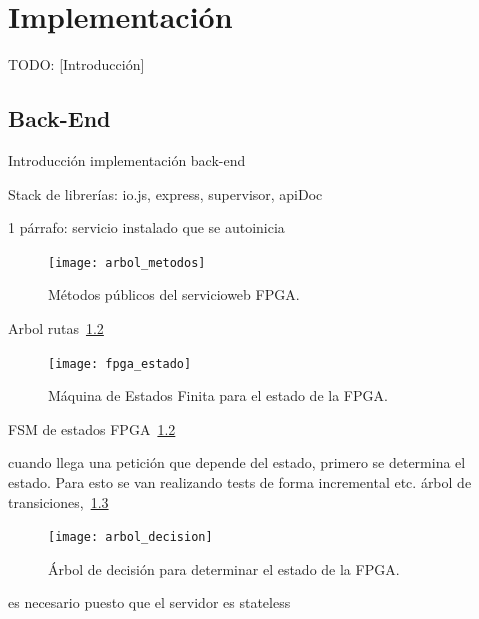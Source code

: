 \chapter{Implementación\label{cap:implementacion}}

TODO: [Introducción]


\section{Back-End\label{sec:imp:back_end}}

Introducción implementación back-end

Stack de librerías: io.js, express, supervisor, apiDoc

1 párrafo: servicio instalado que se autoinicia

\begin{figure}[!htp]
  \centering
  \texttt{[image: arbol\_metodos]}
  \caption{Métodos públicos del \gls{servicioweb} \gls{FPGA}.}
  \label{fig:arbol_metodos}
\end{figure}

Arbol rutas~\ref{fig:fpga_estado}

\begin{figure}[!htp]
  \centering
  \texttt{[image: fpga\_estado]}
  \caption{Máquina de Estados Finita para el estado de la \gls{FPGA}.}
  \label{fig:fpga_estado}
\end{figure}

FSM de estados FPGA~\ref{fig:fpga_estado}

cuando llega una petición que depende del estado, primero se determina el estado. Para esto se van realizando tests de forma incremental etc. árbol de transiciones,~\ref{fig:arbol_decision}

\begin{figure}[!htp]
  \centering
  \texttt{[image: arbol\_decision]}
  \caption{Árbol de decisión para determinar el estado de la \gls{FPGA}.}
  \label{fig:arbol_decision}
\end{figure}
es necesario puesto que el servidor es stateless

